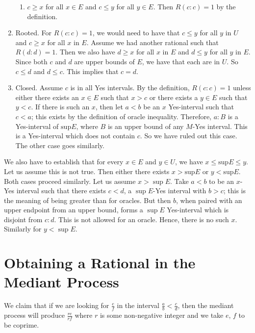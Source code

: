 \documentclass[12pt]{article}
\begin{document}
\begin{enumerate}
\begin{enumerate}
    \item $c \geq x$ for all $x \in E$ and $c \leq y$ for all $y \in E$. Then $R(c:c) = 1$ by the definition. 

     \end{enumerate}
    
    \item Rooted. For $R(c:c)=1$, we would need to have that $c \leq y$ for all $y$ in $U$ and $c \geq x$ for all $x$ in $E$. Assume we had another rational such that $R(d:d) = 1$. Then we also have $d \geq x$ for all $x$ in $E$ and $d \leq y$ for all $y$ in $E$. Since both $c$ and $d$ are upper bounds of $E$, we have that each are in $U$. So $c \leq d$ and $d \leq c$. This implies that $c = d$. 
    \item Closed. Assume $c$ is in all Yes intervals. By the definition, $R(c:c) = 1$ unless either there exists an $x \in E$ such that $x> c$ or there exists a $y \in E$ such that $y < c$. If there is such an $x$, then let $a\lt b$ be an $x$ Yes-interval such that $c \lt a$; this exists by the definition of oracle inequality. Therefore, $a:B$ is a Yes-interval of $\mathrm{sup} E$, where $B$ is an upper bound of any $M$-Yes interval. This is a Yes-interval which does not contain $c$. So we have ruled out this case. The other case goes similarly.
\end{enumerate}

We also have to establish that for every $x \in E$ and $y \in U$, we have $x \leq \mathrm{sup} E \leq y$. Let us assume this is not true. Then either there exists $x > \mathrm{sup} E$ or $y < \mathrm{sup} E$. Both cases proceed similarly. Let us 
assume $ x > \sup E$. Take $a \lt b$ to be an $x$-Yes interval such that there exists $c \lt d$, a $\sup E$-Yes interval with $b > c$; this is the meaning of being greater than for oracles. But then $b$, when paired with an upper endpoint from an upper bound, forms a $\sup E$ Yes-interval which is disjoint from $c:d$. This is not allowed for an oracle. Hence, there is no such $x$. Similarly for $y < \sup E$. 

\section{Obtaining a Rational in the Mediant Process}\label{app:med}

We claim that if we are looking for $\frac{e}{f}$ in the interval $\frac{a}{b} \lt \frac{c}{d}$, then the mediant process will produce $\frac{re}{rf}$ where $r$ is some non-negative integer and we take $e$, $f$ to be coprime. 
\end{document}
